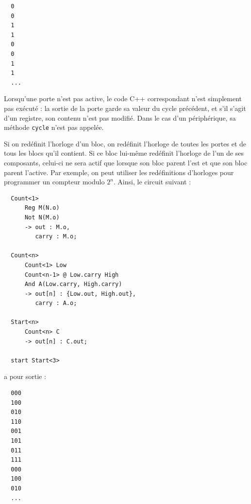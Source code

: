 \documentclass[13pt]{article}
\begin{document}
\begin{verbatim}
  0
  0
  1
  1
  0
  0
  1
  1
  ...
\end{verbatim}
Lorsqu'une porte n'est pas active, le code C++ correspondant n'est
simplement pas exécuté : la sortie de la porte garde sa valeur du cycle
précédent, et s'il s'agit d'un registre, son contenu n'est pas
modifié. Dans le cas d'un périphérique, sa méthode \texttt{cycle} n'est pas
appelée.


Si on redéfinit l'horloge d'un bloc, on redéfinit l'horloge de toutes les
portes et de tous les blocs qu'il contient. Si ce bloc lui-même redéfinit
l'horloge de l'un de ses composants, celui-ci ne sera actif que lorsque son
bloc parent l'est et que son bloc parent l'active. Par exemple, on peut
utiliser les redéfinitions d'horloges pour programmer un compteur modulo $2^n$. Ainsi, le circuit
suivant :
\begin{verbatim}
  Count<1>
      Reg M(N.o)
      Not N(M.o)
      -> out : M.o,
         carry : M.o;

  Count<n>
      Count<1> Low
      Count<n-1> @ Low.carry High
      And A(Low.carry, High.carry)
      -> out[n] : {Low.out, High.out},
         carry : A.o;

  Start<n>
      Count<n> C
      -> out[n] : C.out;

  start Start<3>
\end{verbatim}
a pour sortie :
\begin{verbatim}
  000
  100
  010
  110
  001
  101
  011
  111
  000
  100
  010
  ...
\end{verbatim}
\end{document}
